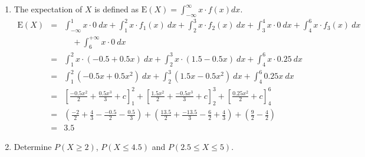\documentclass[12pt,thmsa]{article}
\begin{document}
\begin{enumerate}
\item The expectation of $X$ is defined as $\text{E}(X) = \int_{-\infty}^{\infty} x \cdot f(x) dx$.
  \begin{eqnarray*}
   \text{E}(X) &=& \int_{-\infty}^1 x \cdot 0 \ dx + 
    \int_{1}^2 x \cdot f_{1}(x) \ dx +
    \int_{2}^3 x \cdot f_{2}(x) \ dx +
    \int_{3}^4 x \cdot 0 \ dx + 
    \int_{4}^6 x \cdot f_{3}(x) \ dx\\
   && \quad +    \int_{6}^{+\infty} x \cdot 0 \ dx \\  
    &=& \int_{1}^2 x \cdot (-0.5 + 0.5x) \ dx +
    \int_{2}^3 x \cdot (1.5-0.5x) \ dx +\int_{4}^6 x \cdot 0.25 \ dx \\
    &=& \int_{1}^{2} (-0.5x + 0.5x^2) \ dx +
    \int_{2}^{3} (1.5x - 0.5x^2) \ dx +
    \int_{4}^{6}0.25x \ dx \\
    &=& \left[ \frac{-0.5x^2}{2} + \frac{0.5x^3}{3} + c 
    \right]^{2}_{1} +
    \left[ \frac{1.5x^2}{2} + \frac{-0.5x^3}{3} + c 
    \right]^{3}_{2} +
    \left[ \frac{0.25x^2}{2} + c 
    \right]^{6}_{4} \\
    &=& \left(\frac{-2}{2} + \frac{4}{3} - \frac{-0.5}{2}
      -\frac{0.5}{3} \right)
    + \left( \frac{13.5}{2} + \frac{-13.5}{3} - \frac{6}{2} +
      \frac{4}{3} \right) 
    + \left( \frac{9}{2} - \frac{4}{2} \right) \\
    &=& {3.5}
  \end{eqnarray*}
  
  
%   
%   
  
  
\item Determine $P(X \ge 2)$, $P(X \le 4.5)$ and $P(2.5 \le X \le 5)$.  
       

\end{enumerate}
\end{document}
